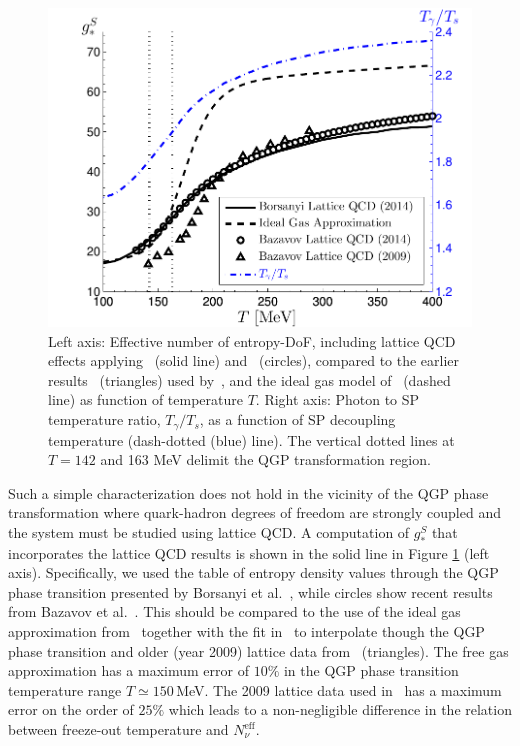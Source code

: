 \begin{figure}
\centerline{\includegraphics[width=0.9\linewidth]{plots/gS_T_ratio.pdf}}
\caption{Left axis: Effective number of entropy-DoF, including lattice QCD effects applying~\cite{Borsanyi:2013bia} (solid line) and~\cite{HotQCD:2014kol} (circles), compared to the earlier results~\cite{Bazavov:2009zn} (triangles) used by~\cite{Anchordoqui:2011nh}, and the ideal gas model of~\cite{Coleman:2003hs} (dashed line) as function of temperature $T$. Right axis: Photon to SP temperature ratio, $T_\gamma/T_s$, as a function of SP decoupling temperature (dash-dotted (blue) line). The vertical dotted lines at $T=142$ and 163 MeV delimit the QGP transformation region. \label{fig:gS}}
 \end{figure}

Such a simple characterization does not hold in the vicinity of the QGP phase transformation where quark-hadron degrees of freedom are strongly coupled and the system must be studied using lattice QCD. A computation of $g_*^S$ that incorporates the lattice QCD results is shown in the solid line in Figure \ref{fig:gS} (left axis). Specifically, we used the table of entropy density values through the QGP phase transition presented by Borsanyi et al.~\cite{Borsanyi:2013bia}, while circles show recent results from Bazavov et al.~\cite{HotQCD:2014kol}. This should be compared to the use of the ideal gas approximation from~\cite{Coleman:2003hs} together with the fit in~\cite{Wantz:2009it} to interpolate though the QGP phase transition and older (year 2009) lattice data from~\cite{Bazavov:2009zn} (triangles). The free gas approximation has a maximum error of $10\%$ in the QGP phase transition temperature range $T\simeq 150$\,MeV. The 2009 lattice data used in~\cite{Anchordoqui:2011nh} has a maximum error on the order of $25\%$ which leads to a non-negligible difference in the relation between freeze-out temperature and $N^{\text{eff}}_{\nu}$.


